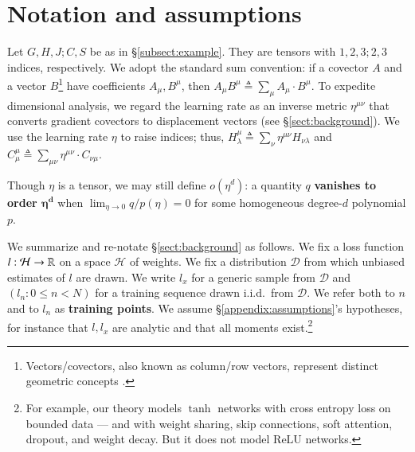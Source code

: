 \documentclass[openany, notitlepage, justified]{tufte-book}
\theoremstyle{plain}
\theoremstyle{definition}
\newcommand{\Dd}{\mathcal{D}}
\newcommand{\Hh}{\mathcal{H}}
\begin{document}
\section{Notation and assumptions} \label{sect:notation}
       

        Let $G, H, J; C, S$ be as in \S \ref{subsect:example}.  They are
        tensors with $1, 2, 3; 2, 3$ indices, respectively.
        We adopt the standard sum convention: if a covector $A$ and a vector
        $B$\footnote{
            Vectors/covectors, also known as column/row vectors,
            represent distinct geometric concepts \citep{ko93}. 
        } have coefficients $A_\mu, B^\mu$, then 
        $
            A_\mu B^\mu
            \triangleq
            \sum_\mu A_\mu \cdot B^\mu
        $.
        To expedite dimensional analysis,
        we regard the learning rate as an
        inverse metric $\eta^{\mu\nu}$ that converts gradient covectors to
        displacement vectors (see \S\ref{sect:background}).  We use the
        learning rate $\eta$ to raise indices; thus,
        $
            H^{\mu}_{\lambda}
            \triangleq
            \sum_{\nu} 
            \eta^{\mu\nu} H_{\nu\lambda}
        $ and
        $
            C^{\mu}_{\mu}
            \triangleq
            \sum_{\mu \nu} \eta^{\mu\nu} \cdot C_{\nu\mu}
        $.

        Though $\eta$ is a tensor, we may still define $o(\eta^d)$: a quantity
        $q$ \textbf{vanishes to order $\mathbf{\eta^d}$} when $\lim_{\eta\to 0}
        q/p(\eta) = 0$ for some homogeneous degree-$d$ polynomial $p$.



        We summarize and re-notate \S\ref{sect:background} as follows.
        We fix a loss function $l:\Hh\to\RR$ on a space $\Hh$ of weights.  We
        fix a distribution $\Dd$ from which unbiased estimates of $l$ are
        drawn.  We write $l_x$ for a generic sample from $\Dd$ and $(l_n: 0\leq
        n<N)$ for a training sequence drawn i.i.d.\ from $\Dd$.  We refer both
        to $n$ and to $l_n$ as \textbf{training points}.  We assume
        \S\ref{appendix:assumptions}'s hypotheses, for instance that $l, l_x$
        are analytic and that all moments exist.\footnote{
            For example, our theory models $\tanh$ networks with cross entropy
            loss on bounded data --- and with weight sharing, skip connections,
            soft attention, dropout, and weight decay.  But it does not model
            $\text{ReLU}$ networks.
        }
        
\end{document}
